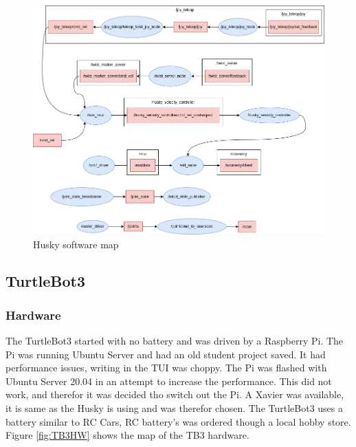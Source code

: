 \begin{figure}[H]
    \centering
    \includegraphics[width = 1\textwidth]{Figures/drawio/husky_rqt.drawio.png}
    \caption{Husky software map}
    \label{fig:HuskySW}
\end{figure}

\subsection{TurtleBot3}
\subsubsection{Hardware}
The TurtleBot3 started with no battery and was driven by a Raspberry Pi. The Pi was running Ubuntu Server and had an old student project saved. It had performance issues, writing in the TUI was choppy. The Pi was flashed with Ubuntu Server 20.04 in an attempt to increase the performance. This did not work, and therefor it was decided tho switch out the Pi. A Xavier was available, it is same as the Husky is using and was therefor chosen. The TurtleBot3 uses a battery similar to RC Cars, RC battery's was ordered though a local hobby store. Figure \ref{fig:TB3HW} shows the map of the TB3 hardware. 

